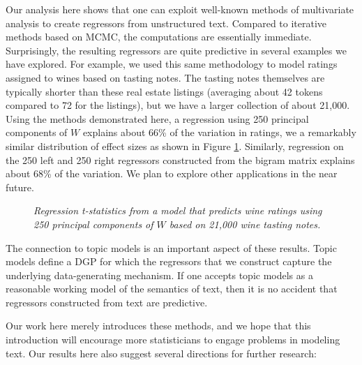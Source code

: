 \documentclass[12pt]{article}
\begin{document}
 Our analysis here shows that one can exploit well-known methods of multivariate analysis to create regressors from unstructured text.  Compared to iterative methods based on MCMC, the computations are essentially immediate.  Surprisingly, the resulting regressors are quite predictive in several examples we have explored.  For example, we used this same methodology to model ratings assigned to wines based on tasting notes.  The tasting notes themselves are typically shorter than these real estate listings (averaging about 42 tokens compared to 72 for the listings), but we have a larger collection of about 21,000.  Using the methods demonstrated here, a regression using 250 principal components of $W$ explains about 66\% of the variation in ratings, we a remarkably similar distribution of effect sizes as shown in Figure \ref{fig:wine}.  Similarly, regression on the 250 left and 250 right regressors constructed from the bigram matrix explains about 68\% of the variation.  We plan to explore other applications in the near future.
 
 
 \begin{figure}
 \caption{ \label{fig:wine} \sl Regression t-statistics from a model that predicts wine ratings using 250 principal components of $W$ based on 21,000 wine tasting notes.}
 
 \centerline{
   }
  \end{figure} 
  
  
   The connection to topic models is an important aspect of these results.  Topic models define a DGP for which the regressors that we construct capture the underlying data-generating mechanism.  If one accepts topic models as a reasonable working model of the semantics of text, then it is no accident that regressors constructed from text are predictive.


 Our work here merely introduces these methods, and we hope that this introduction will encourage more statisticians to engage problems in  modeling text.  Our results here also suggest several directions for further research:
\end{document}
